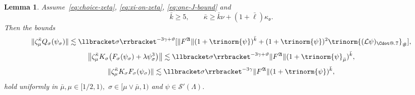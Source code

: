 \documentclass{article}
\makeatletter
\numberwithin{equation}{section}
\newcommand*\Cdot{{\mathpalette\Cdot@{.7}}}
\newcommand*\Cdot@[2]{\mathbin{\vcenter{\hbox{\scalebox{#2}{\hspace{0.1mm}$\m@th#1\bullet$\hspace{0.1mm}}}}}}
\theoremstyle{plain}
\newtheorem{lemma}[theorem]{Lemma}
\theoremstyle{definition}
\makeatother
\begin{document}
\begin{lemma}
  \label{lem:overall-difference-bound}Assume~\eqref{eq:choice-zeta},
  \eqref{eq:xi-on-zeta}, \eqref{eq:one-J-bound} and
  \begin{equation}
    \bar{k} \geqslant 5, \qquad \bar{\kappa} \geqslant \bar{k} \nu + (1 +
    \bar{\ell}) \kappa_{\mathfrak{o}} \label{eq:cond-kappabar-one} .
  \end{equation}
  Then the bounds
  \begin{equation}
      \| \zeta_{\mu}^{\bar{\kappa}} Q_{\sigma} (\psi_{\sigma}) \|  \lesssim 
      \llbracket \sigma \rrbracket^{- 3 \gamma + \vartheta}  [\|
      F^{\mathfrak{A}} \|  (1 + \trinorm{ \psi })^{\bar{k}} + (1 +
      \trinorm{ \psi })^2 \trinorm{(\mathcal L\psi)_\Cdot
      }_{\#}],
\label{eq:bound-Q}
  \end{equation}
  \begin{equation}
  		\left\|
  		\zeta_{\mu}^{\bar{\kappa}} K_{\sigma}
  		\bigl(F_{\sigma}(\psi_{\sigma})
  		+ \lambda \psi_{\sigma}^{3}\bigr)
  		\right\|
  		\lesssim
  		\llbracket \sigma \rrbracket^{-3\gamma+\vartheta}
  		\|F^{\mathfrak A}\|
  		(1+\trinorm{\psi}_{\bar\mu})^{\bar k},
  	\label{eq:K-force-coercive-remainder}
  \end{equation}
  \begin{equation}
      \| \zeta_{\mu}^{\bar{\kappa}} K_{\sigma} F_{\sigma} (\psi_{\sigma}) \| 
      \lesssim  \llbracket \sigma \rrbracket^{- 3 \gamma}  \|
      F^{\mathfrak{A}} \|  (1 + \trinorm{ \psi })^{\bar{k}},
       \label{eq:bound-JtildeF}
  \end{equation}
  hold uniformly in $\bar{\mu}, \mu \in [1 / 2, 1),$ $\sigma \in [\mu \vee
  \bar{\mu}, 1) $ and $\psi \in \mathcal{S}' (\Lambda)$.
\end{lemma}
\end{document}
